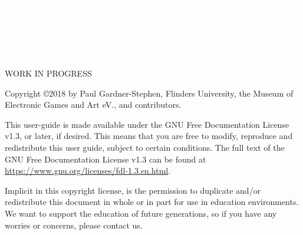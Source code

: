 \documentclass[twoside]{book}
\makeatletter
\def\cleardoublepage{\clearpage\if@twoside
\ifodd\c@page
\else\hbox{}\thispagestyle{empty}\newpage
\if@twocolumn\hbox{}\newpage\fi\fi\fi}
\makeatother
\begin{document}



%

\cleardoublepage


  \begin{titlepage}
    \pagecolor{blue}
     \begin{center}
       {
         \large
         \vspace*{2cm}
               {\Huge\textcolor{white}{\bf{MEGA65 USER'S GUIDE}}}\\
             \vspace{\fill}
                 {\textcolor{white}{Published by \\ the Museum of Electronic Games and Art (M.E.G.A.) eV., Germany.\\and\\Flinders University, Australia.}}
       }
     \end{center}
   \end{titlepage}

  \pagecolor{white}\textcolor{black}
  \vfill
  WORK IN PROGRESS
  
  Copyright \copyright 2018 by Paul Gardner-Stephen, Flinders University, the Museum of Electronic Games and Art eV., and contributors.

  This user-guide is made available under the GNU Free Documentation License v1.3, or later, if desired. This means that you are free to modify, reproduce
  and redistribute this user guide, subject to certain conditions. The full text of the GNU Free Documentation License v1.3 can be
  found at \url{https://www.gnu.org/licenses/fdl-1.3.en.html}.

  Implicit in this copyright license, is the permission to duplicate and/or redistribute this document in whole or in part for use in
  education environments.  We want to support the education of future generations, so if you have any worries or concerns, please
  contact us.
             
\end{document}
